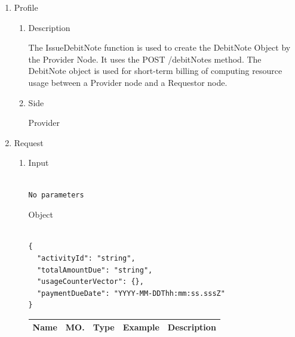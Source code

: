 
\begin{enumerate}

\item Profile

\begin{enumerate}

\item Description

The IssueDebitNote function is used to create the DebitNote Object by the Provider Node. It uses the POST /debitNotes method.
The DebitNote object is used for short-term billing of computing resource usage between a Provider node and a Requestor node.
 
\item Side

Provider

\end{enumerate}

\item Request

\begin{enumerate}

\item Input

\begin{tcolorbox}[boxrule=0pt, frame empty]
\begin{verbatim}

No parameters

\end{verbatim}
\end{tcolorbox}

Object

\begin{tcolorbox}[boxrule=0pt, frame empty]
\begin{verbatim}

{
  "activityId": "string",
  "totalAmountDue": "string",
  "usageCounterVector": {},
  "paymentDueDate": "YYYY-MM-DDThh:mm:ss.sssZ"
}

\end{verbatim}
\end{tcolorbox}

\begin{table}[H]
\footnotesize

\begin{center}
\begin{tabular}{|p{3cm}|l|p{3cm}|p{3cm}|p{4cm}|} 
\hline
\rowcolor{lightgray}	Name	& MO.	& Type	& Example & 	Description \\
\hline


\end{tabular}
\end{center}
\end{table}
\end{enumerate}
\end{enumerate}
